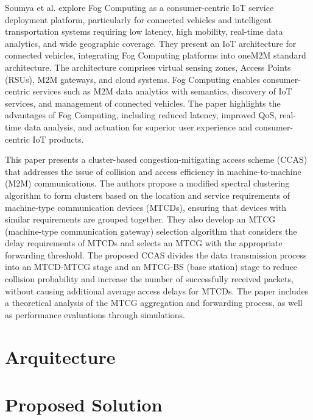\documentclass[a4paper,fleqn]{cas-dc}
\begin{document}
Soumya et al. \cite{Datta2015} explore Fog Computing as a consumer-centric IoT service deployment platform, particularly for connected vehicles and intelligent transportation systems requiring low latency, high mobility, real-time data analytics, and wide geographic coverage. They present an IoT architecture for connected vehicles, integrating Fog Computing platforms into oneM2M standard architecture. The architecture comprises virtual sensing zones, Access Points (RSUs), M2M gateways, and cloud systems. Fog Computing enables consumer-centric services such as M2M data analytics with semantics, discovery of IoT services, and management of connected vehicles. The paper highlights the advantages of Fog Computing, including reduced latency, improved QoS, real-time data analysis, and actuation for superior user experience and consumer-centric IoT products.

This paper \cite{Liang2018} presents a cluster-based congestion-mitigating access scheme (CCAS) that addresses the issue of collision and access efficiency in machine-to-machine (M2M) communications. The authors propose a modified spectral clustering algorithm to form clusters based on the location and service requirements of machine-type communication devices (MTCDs), ensuring that devices with similar requirements are grouped together. They also develop an MTCG (machine-type communication gateway) selection algorithm that considers the delay requirements of MTCDs and selects an MTCG with the appropriate forwarding threshold. The proposed CCAS divides the data transmission process into an MTCD-MTCG stage and an MTCG-BS (base station) stage to reduce collision probability and increase the number of successfully received packets, without causing additional average access delays for MTCDs. The paper includes a theoretical analysis of the MTCG aggregation and forwarding process, as well as performance evaluations through simulations.


\section{Arquitecture}

\section{Proposed Solution}
\end{document}
